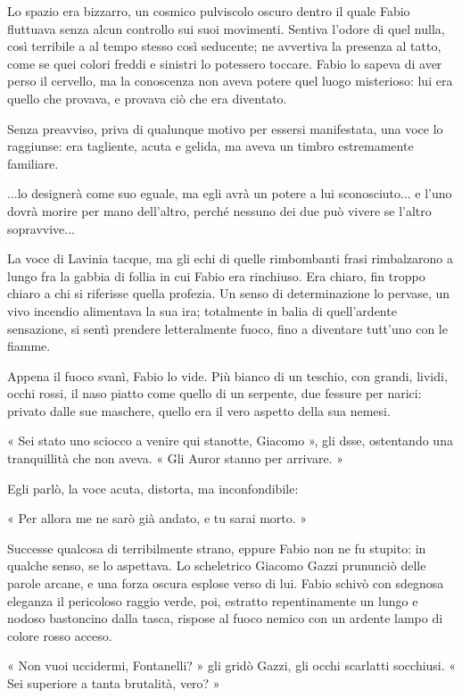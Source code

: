 Lo spazio era bizzarro, un cosmico pulviscolo oscuro dentro il quale Fabio fluttuava senza alcun controllo sui suoi movimenti. Sentiva l'odore di quel nulla, così terribile a al tempo stesso così seducente; ne avvertiva la presenza al tatto, come se quei colori freddi e sinistri lo potessero toccare. Fabio lo sapeva di aver perso il cervello, ma la conoscenza non aveva potere quel luogo misterioso: lui era quello che provava, e provava ciò che era diventato.

Senza preavviso, priva di qualunque motivo per essersi manifestata, una voce lo raggiunse: era tagliente, acuta e gelida, ma aveva un timbro estremamente familiare.

...lo designerà come suo eguale, ma egli avrà un potere a lui sconosciuto...
e l'uno dovrà morire per mano dell'altro, perché nessuno dei due può vivere se l'altro sopravvive...

La voce di Lavinia tacque, ma gli echi di quelle rimbombanti frasi rimbalzarono a lungo fra la gabbia di follia in cui Fabio era rinchiuso. Era chiaro, fin troppo chiaro a chi si riferisse quella profezia. Un senso di determinazione lo pervase, un vivo incendio alimentava la sua ira; totalmente in balia di quell'ardente sensazione, si sentì prendere letteralmente fuoco, fino a diventare tutt'uno con le fiamme.

Appena il fuoco svanì, Fabio lo vide. Più bianco di un teschio, con grandi, lividi, occhi rossi, il naso piatto come quello di un serpente, due fessure per narici: privato dalle sue maschere, quello era il vero aspetto della sua nemesi.

« Sei stato uno sciocco a venire qui stanotte, Giacomo », gli dsse, ostentando una tranquillità che non aveva. « Gli Auror stanno per arrivare. »

Egli parlò, la voce acuta, distorta, ma inconfondibile:

« Per allora me ne sarò già andato, e tu sarai morto. »

Successe qualcosa di terribilmente strano, eppure Fabio non ne fu stupito: in qualche senso, se lo aspettava. Lo scheletrico Giacomo Gazzi prununciò delle parole arcane, e una forza oscura esplose verso di lui. Fabio schivò con sdegnosa eleganza il pericoloso raggio verde, poi, estratto repentinamente un lungo e nodoso bastoncino dalla tasca, rispose al fuoco nemico con un ardente lampo di colore rosso acceso.

« Non vuoi uccidermi, Fontanelli? » gli gridò Gazzi, gli occhi scarlatti socchiusi. « Sei superiore a tanta brutalità, vero? »

